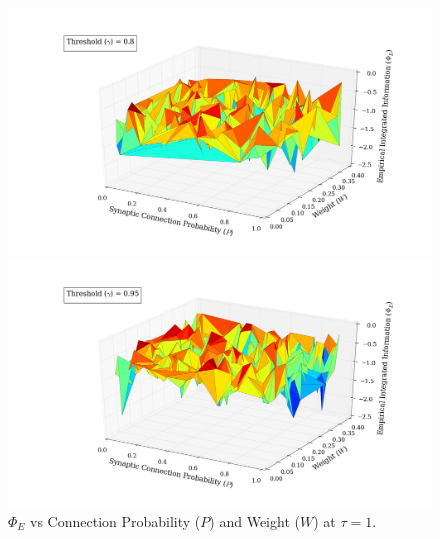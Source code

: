 \documentclass[a4paper,11pt]{article}
\begin{document}
\begin{figure}[H] 
	\begin{minipage}[b]{0.5\linewidth}
		\begin{center}
		\includegraphics[scale = 0.2]{figures/snn/p_w_phi_8_1}
		\end{center}
		\vspace{4ex}
	\end{minipage}
	\begin{minipage}[b]{0.5\linewidth}
		\begin{center}
		\includegraphics[scale = 0.2]{figures/snn/p_w_phi_95_1}
		\end{center}
		\vspace{4ex}
	\end{minipage}
	\caption{
		$\Phi_E$ vs Connection Probability ($P$) and Weight ($W$) at $\tau = 1.$
		\label{fig:p_w_phi_1}
	}
\end{figure}
\end{document}
